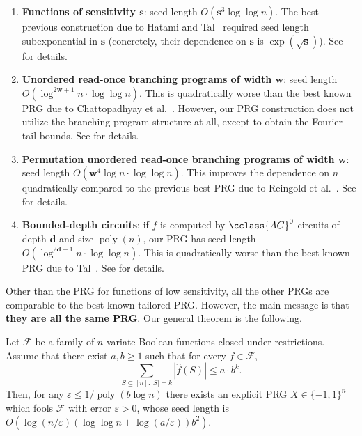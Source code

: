 \documentclass{toc}
\newcommand{\FF}{\mathcal{F}}
\newcommand{\eps}{\varepsilon}
\DeclareMathOperator{\poly}{poly}      %
\begin{document}
\begin{enumerate}
%
%


\item {\bf Functions of sensitivity $\mathbf{s}$}: seed length $O(\mathbf{s}^3 \log \log n)$. The best previous construction due to Hatami and Tal~\cite{hatami2017pseudorandom} required seed length subexponential in $\mathbf{s}$ (concretely, their dependence on
   $\mathbf{s}$
  is $\exp(\sqrt{\mathbf{s}})$). See  for details.

%
%

\item {\bf Unordered read-once branching programs of width $\mathbf{w}$}: seed length $O(\log^{2\mathbf{w}+1} n \cdot \log\log n)$. This is quadratically worse than the best known PRG due to Chattopadhyay et al.~\cite{chattopadhyay2018improved}. However, our PRG construction does not utilize the branching program structure at all, except to obtain the Fourier tail bounds. See  for details.

%
%

\item {\bf Permutation unordered read-once branching programs of width $\mathbf{w}$}: seed length $O(\mathbf{w}^4 \log n  \cdot \log\log n)$. This improves the dependence on $n$ quadratically compared to the previous best PRG due to Reingold et al.~\cite{reingold2013pseudorandomness}. See  for details.
	
%
\item {\bf Bounded-depth circuits}:  %
if $f$ is computed by $\cclass{AC}^0$ circuits of depth $\mathbf{d}$ and size $\poly(n)$, our PRG has seed length
%
%
	$O(\log^{2\mathbf{d}-1} n \cdot \log\log n )$. This is quadratically worse than the best known PRG due to Tal~\cite{tal2017tight}.
See  for details.
\end{enumerate}

Other than the PRG for functions of low sensitivity, all the other PRGs are comparable to the best known tailored PRG\@. However, the main message
is that {\bf they are all the same PRG}. Our general theorem is the following.

\begin{theorem}
\label{thm:L1_informal}
Let $\FF$ be a family of $n$-variate Boolean functions closed under restrictions.
Assume that there exist $a,b \ge 1$ such that for every $f \in \FF$,
$$
\sum_{S \subseteq [n]: |S|=k} |\hat{f}(S)| \le a \cdot b^k.
$$
Then, for any $ \eps\leq {1}/{\poly(b \log n)}$ there exists an explicit PRG $X \in \{-1,1\}^n$ which fools $\FF$ with error $\eps>0$,
whose seed length is $O(\log(n/\eps)  (\log\log n + \log(a/\eps)) b^2)$.
\end{theorem}
\end{document}
